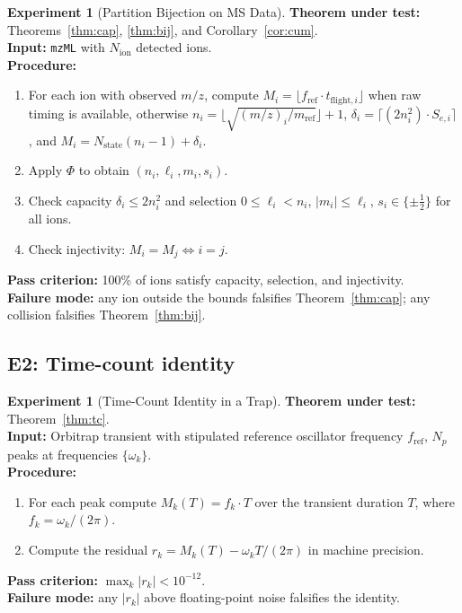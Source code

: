 \documentclass[twocolumn,10pt,a4paper]{article}
\theoremstyle{thmstyle}
\theoremstyle{definition}
\newtheorem{experiment}[theorem]{Experiment}
\theoremstyle{remark}
\newcommand{\PhiMap}{\varPhi}
\newcommand{\Nstate}{N_{\mathrm{state}}}
\begin{document}
\begin{experiment}[Partition Bijection on MS Data]
\label{exp:e1}
\textbf{Theorem under test:} Theorems~\ref{thm:cap},
\ref{thm:bij}, and Corollary~\ref{cor:cum}.\\
\textbf{Input:} \texttt{mzML} with $N_{\mathrm{ion}}$ detected ions.\\
\textbf{Procedure:}
\begin{enumerate}[nosep,leftmargin=*]
\item For each ion with observed $m/z$, compute
$M_{i}=\lfloor f_{\mathrm{ref}}\cdot t_{\mathrm{flight},i}\rfloor$
when raw timing is available, otherwise
$n_{i}=\lfloor\sqrt{(m/z)_{i}/m_{\mathrm{ref}}}\rfloor+1$,
$\delta_{i}=\lceil(2n_{i}^{2})\cdot S_{e,i}\rceil$, and
$M_{i}=\Nstate(n_{i}-1)+\delta_{i}$.
\item Apply $\PhiMap$ to obtain $(n_{i},\ell_{i},m_{i},s_{i})$.
\item Check capacity $\delta_{i}\leq 2n_{i}^{2}$ and selection
$0\leq\ell_{i}<n_{i}$, $|m_{i}|\leq\ell_{i}$,
$s_{i}\in\{\pm\tfrac{1}{2}\}$ for all ions.
\item Check injectivity: $M_{i}=M_{j}\Leftrightarrow i=j$.
\end{enumerate}
\textbf{Pass criterion:} 100\% of ions satisfy capacity, selection,
and injectivity.\\
\textbf{Failure mode:} any ion outside the bounds falsifies
Theorem~\ref{thm:cap}; any collision falsifies Theorem~\ref{thm:bij}.
\end{experiment}

\subsection{E2: Time-count identity}

\begin{experiment}[Time-Count Identity in a Trap]
\label{exp:e2}
\textbf{Theorem under test:} Theorem~\ref{thm:tc}.\\
\textbf{Input:} Orbitrap transient with stipulated reference
oscillator frequency $f_{\mathrm{ref}}$, $N_{p}$ peaks at frequencies
$\{\omega_{k}\}$.\\
\textbf{Procedure:}
\begin{enumerate}[nosep,leftmargin=*]
\item For each peak compute $M_{k}(T)=f_{k}\cdot T$ over the transient
duration $T$, where $f_{k}=\omega_{k}/(2\pi)$.
\item Compute the residual $r_{k}=M_{k}(T)-\omega_{k}T/(2\pi)$ in
machine precision.
\end{enumerate}
\textbf{Pass criterion:} $\max_{k}|r_{k}|<10^{-12}$.\\
\textbf{Failure mode:} any $|r_{k}|$ above floating-point noise
falsifies the identity.
\end{experiment}
\end{document}
